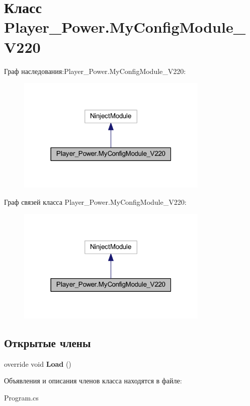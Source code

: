 \section{Класс Player\-\_\-\-Power.\-My\-Config\-Module\-\_\-\-V220}
\label{class_player___power_1_1_my_config_module___v220}


Граф наследования\-:Player\-\_\-\-Power.\-My\-Config\-Module\-\_\-\-V220\-:
\nopagebreak
\begin{figure}[H]
\begin{center}
\leavevmode
\includegraphics[width=259pt]{class_player___power_1_1_my_config_module___v220__inherit__graph}
\end{center}
\end{figure}


Граф связей класса Player\-\_\-\-Power.\-My\-Config\-Module\-\_\-\-V220\-:
\nopagebreak
\begin{figure}[H]
\begin{center}
\leavevmode
\includegraphics[width=259pt]{class_player___power_1_1_my_config_module___v220__coll__graph}
\end{center}
\end{figure}
\subsection*{Открытые члены}
\begin{DoxyCompactItemize}
\item 
override void {\bfseries Load} ()\label{class_player___power_1_1_my_config_module___v220_aac02cf2b257498e7786c0ff13c39b64e}

\end{DoxyCompactItemize}


Объявления и описания членов класса находятся в файле\-:\begin{DoxyCompactItemize}
\item 
Program.\-cs\end{DoxyCompactItemize}

